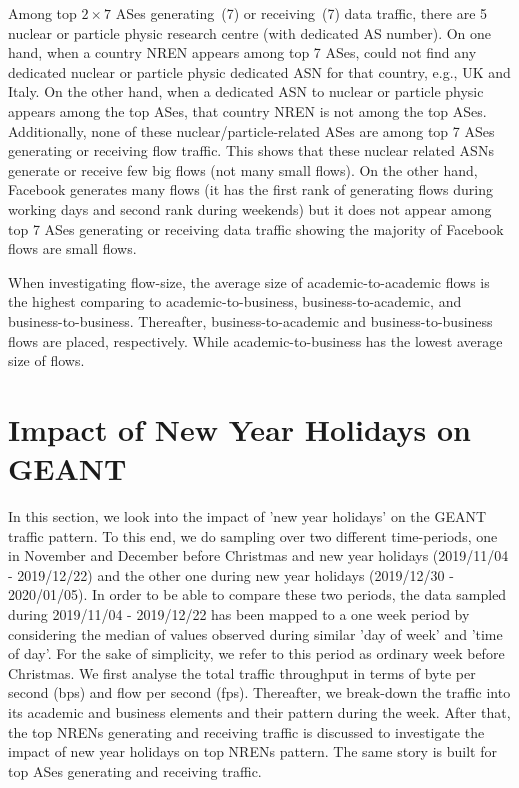 \documentclass[10pt, journal, letterpaper]{IEEEtran}
\begin{document}
Among top $2\times7$ ASes generating~(7) or receiving~(7) data traffic, there are 5 nuclear or particle physic research centre (with dedicated AS number). On one hand, when a country NREN appears among top 7 ASes, could not find any dedicated nuclear or particle physic dedicated ASN for that country, e.g., UK and Italy. On the other hand, when a dedicated ASN to nuclear or particle physic appears among the top ASes, that country NREN is not among the top ASes. Additionally, none of these nuclear/particle-related ASes are among top 7 ASes generating or receiving flow traffic. This shows that these nuclear related ASNs generate or receive few big flows (not many small flows). On the other hand, Facebook generates many flows (it has the first rank of generating flows during working days and second rank during weekends) but it does not appear among top 7 ASes generating or receiving data traffic showing the majority of Facebook flows are small flows. 

When investigating flow-size, the average size of academic-to-academic flows is the highest comparing to academic-to-business, business-to-academic, and business-to-business. Thereafter, business-to-academic and business-to-business flows are placed, respectively. While academic-to-business has the lowest average size of flows.



\section{Impact of New Year Holidays on GEANT}
In this section, we look into the impact of 'new year holidays' on the GEANT traffic pattern. To this end, we do sampling over two different time-periods, one in November and December before Christmas and new year holidays (2019/11/04 - 2019/12/22) and the other one during new year holidays (2019/12/30 - 2020/01/05). In order to be able to compare these two periods, the data sampled during 2019/11/04 - 2019/12/22 has been mapped to a one week period by considering the median of values observed during similar 'day of week' and 'time of day'. For the sake of simplicity, we refer to this period as ordinary week before Christmas. We first analyse the total traffic throughput in terms of byte per second (bps) and flow per second (fps). Thereafter, we break-down the traffic into its academic and business elements and their pattern during the week. After that, the top NRENs generating and receiving traffic is discussed to investigate the impact of new year holidays on top NRENs pattern. The same story is built for top ASes generating and receiving traffic.
\end{document}
